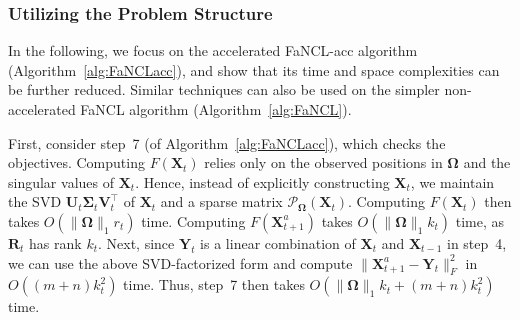 \documentclass[10pt,journal,compsoc]{IEEEtran}
\newcommand{\X}{\mathbf{X}}
\newcommand{\NM}[2]{\| #1 \|_{#2} }
\newcommand{\SO}[1]{\mathcal{P}_{\mathbf{\Omega}}(#1)}
\begin{document}
\subsubsection{Utilizing the Problem Structure}

In the following, we focus on 
the accelerated \textsf{FaNCL-acc} algorithm (Algorithm~\ref{alg:FaNCLacc}), 
and show that its time and space complexities 
can be further reduced.
Similar techniques can also be used on 
the simpler non-accelerated \textsf{FaNCL} algorithm (Algorithm~\ref{alg:FaNCL}).

First, consider step~7
(of Algorithm~\ref{alg:FaNCLacc}), 
which checks the objectives.
Computing $F(\X_t)$ relies only on the observed positions in $\mathbf{\Omega}$ and the singular values of $\X_t$.
Hence, instead of explicitly constructing $\X_t$, 
we maintain 
the SVD 
$\mathbf{U}_t \mathbf{\Sigma}_t \mathbf{V}_t^{\top}$
of $\X_t$ and a sparse matrix $\SO{\X_t}$.
Computing $F(\X_t)$ then takes $O(\NM{\mathbf{\Omega}}{1} r_t)$ time.
Computing $F(\X^a_{t + 1})$ takes $O( \NM{\mathbf{\Omega}}{1} k_t )$ time, as $\mathbf{R}_t$
has rank $k_t$.
Next,
since $\mathbf{Y}_{t}$ is a linear combination of $\X_t$ and $\X_{t - 1}$ in step~4,
we can use the above SVD-factorized form and compute $\NM{\X^a_{t + 1} - \mathbf{Y}_t}{F}^2$ in $O((m + n) k^2_t )$ time.
Thus,
step~7 then takes $O( \NM{\mathbf{\Omega}}{1}k_t + (m + n)k_t^2 )$ time.
\end{document}
